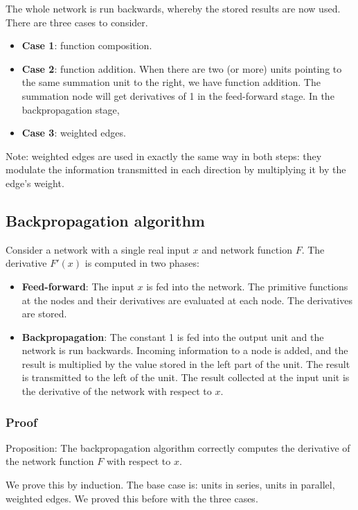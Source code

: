 \documentclass[a4paper,12pt]{article}
\begin{document}
The whole network is run backwards, whereby the stored results are now used. There are three cases to consider. 
\begin{itemize}
\item
\textbf{Case 1}: function composition. 
\item
\textbf{Case 2}: function addition. When there are two (or more) units pointing to the same summation unit to the right, we have function addition. The summation node will get derivatives of 1 in the feed-forward stage. In the backpropagation stage, 
\item
\textbf{Case 3}: weighted edges. 
\end{itemize}

Note: weighted edges are used in exactly the same way in both steps: they modulate the information transmitted in each direction by multiplying it by the edge's weight. 

\subsection{Backpropagation algorithm}

Consider a network with a single real input $x$ and network function $F$. The derivative $F'(x)$ is computed in two phases: 

\begin{itemize}
\item
\textbf{Feed-forward}: The input $x$ is fed into the network. The primitive functions at the nodes and their derivatives are evaluated at each node. The derivatives are stored. 
\item
\textbf{Backpropagation}: The constant 1 is fed into the output unit and the network is run backwards. Incoming information to a node is added, and the result is multiplied by the value stored in the left part of the unit. The result is transmitted to the left of the unit. The result collected at the input unit is the derivative of the network with respect to $x$. 
\end{itemize}

\subsubsection{Proof}

Proposition: The backpropagation algorithm correctly computes the derivative of the network function $F$ with respect to $x$. 

We prove this by induction. The base case is: units in series, units in parallel, weighted edges. We proved this before with the three cases. 
\end{document}
